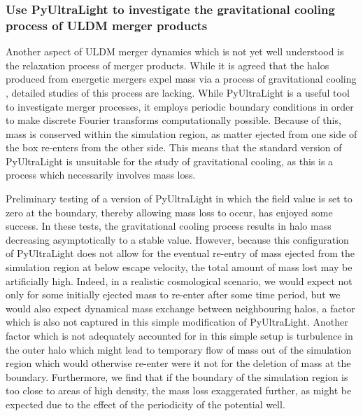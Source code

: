 \subsubsection{Use PyUltraLight to investigate the gravitational cooling process of ULDM merger products}

Another aspect of ULDM merger dynamics which is not yet well understood is the relaxation process of merger products. While it is agreed that the halos produced from energetic mergers expel mass via a process of gravitational cooling \cite{Schwabe:2016rze, Guzman:2006yc}, detailed studies of this process are lacking. While PyUltraLight is a useful tool to investigate merger processes, it employs periodic boundary conditions in order to make discrete Fourier transforms computationally possible. Because of this, mass is conserved within the simulation region, as matter ejected from one side of the box re-enters from the other side. This means that the standard version of PyUltraLight is unsuitable for the study of gravitational cooling, as this is a process which necessarily involves mass loss.

Preliminary testing of a version of PyUltraLight in which the field value is set to zero at the boundary, thereby allowing mass loss to occur, has enjoyed some success. In these tests, the gravitational cooling process results in halo mass decreasing asymptotically to a stable value. However, because this configuration of PyUltraLight does not allow for the eventual re-entry of mass ejected from the simulation region at below escape velocity, the total amount of mass lost may be artificially high. Indeed, in a realistic cosmological scenario, we would expect not only for some initially ejected mass to re-enter after some time period, but we would also expect dynamical mass exchange between neighbouring halos, a factor which is also not captured in this simple modification of PyUltraLight. Another factor which is not adequately accounted for in this simple setup is turbulence in the outer halo which might lead to temporary flow of mass out of the simulation region which would otherwise re-enter were it not for the deletion of mass at the boundary. Furthermore, we find that if the boundary of the simulation region is too close to areas of high density, the mass loss exaggerated further, as might be expected due to the effect of the periodicity of the potential well. 

